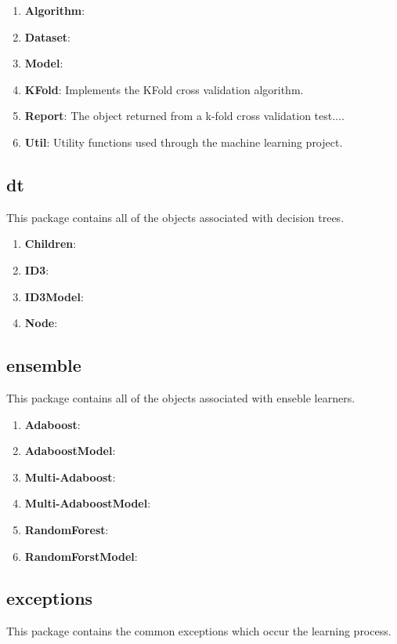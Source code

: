 \documentclass[11pt]{article}
\newcommand{\bb}{\textbf}
\begin{document}
\begin{enumerate}[leftmargin=*]
  \item[] \bb{Algorithm}:
  \item[] \bb{Dataset}:
  \item[] \bb{Model}:
  \item[] \bb{KFold}: Implements the KFold cross validation algorithm.
  \item[] \bb{Report}: The object returned from a k-fold cross validation test....
  \item[] \bb{Util}: Utility functions used through the machine learning project.
\end{enumerate}

\subsection{dt}
This package contains all of the objects associated with decision trees.

\begin{enumerate}[leftmargin=*]
  \item[] \bb{Children}:
  \item[] \bb{ID3}:
  \item[] \bb{ID3Model}:
  \item[] \bb{Node}:
\end{enumerate}

\subsection{ensemble}
This package contains all of the objects associated with enseble learners.

\begin{enumerate}[leftmargin=*]
  \item[] \bb{Adaboost}:
  \item[] \bb{AdaboostModel}:
  \item[] \bb{Multi-Adaboost}:
  \item[] \bb{Multi-AdaboostModel}:
  \item[] \bb{RandomForest}:
  \item[] \bb{RandomForstModel}:
\end{enumerate}

\subsection{exceptions}
This package contains the common exceptions which occur the learning process.
\end{document}
